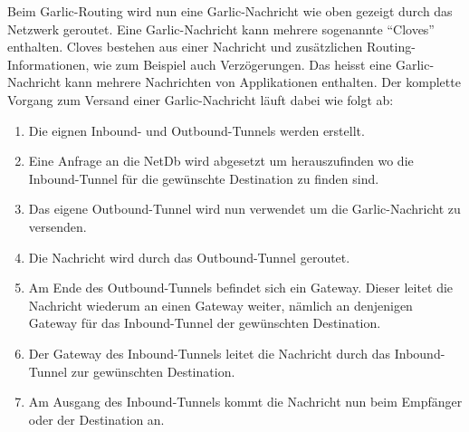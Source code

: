 Beim Garlic-Routing wird nun eine Garlic-Nachricht wie oben gezeigt durch das Netzwerk geroutet.
Eine Garlic-Nachricht kann mehrere sogenannte ``Cloves'' enthalten.
Cloves bestehen aus einer Nachricht und zusätzlichen Routing-Informationen, wie zum Beispiel auch Verzögerungen.
Das heisst eine Garlic-Nachricht kann mehrere Nachrichten von Applikationen enthalten.
Der komplette Vorgang zum Versand einer Garlic-Nachricht läuft dabei wie folgt ab:

\begin{enumerate}
    \item Die eignen Inbound- und Outbound-Tunnels werden erstellt.
    \item Eine Anfrage an die NetDb wird abgesetzt um herauszufinden wo die Inbound-Tunnel für die gewünschte Destination zu finden sind.
    \item Das eigene Outbound-Tunnel wird nun verwendet um die Garlic-Nachricht zu versenden.
    \item Die Nachricht wird durch das Outbound-Tunnel geroutet.
    \item Am Ende des Outbound-Tunnels befindet sich ein Gateway. Dieser leitet die Nachricht wiederum an einen Gateway weiter,
      nämlich an denjenigen Gateway für das Inbound-Tunnel der gewünschten Destination.
    \item Der Gateway des Inbound-Tunnels leitet die Nachricht durch das Inbound-Tunnel zur gewünschten Destination.
    \item Am Ausgang des Inbound-Tunnels kommt die Nachricht nun beim Empfänger oder der Destination an.
\end{enumerate}
\\
\parencites[S.~4]{conrad_survey_2014}[S.~2]{ehlert_i2p_2011}{noauthor_intro_nodate}


%
%
%
%
%



